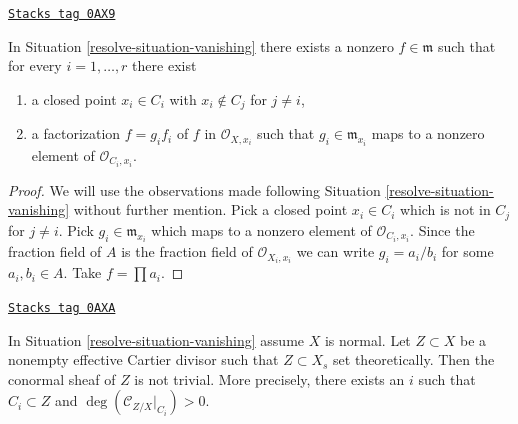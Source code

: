 \begin{lemma}
\label{resolve-lemma-nice-meromorphic-function}
\href{https://stacks.math.columbia.edu/tag/0AX9}{\texttt{Stacks tag 0AX9}}

In Situation \ref{resolve-situation-vanishing} there exists a nonzero
$f \in \mathfrak m$ such that for every $i = 1, \ldots, r$ there exist
\begin{enumerate}
\item a closed point $x_i \in C_i$ with $x_i \not \in C_j$ for $j \not = i$,
\item a factorization $f = g_i f_i$ of $f$ in $\mathcal{O}_{X, x_i}$
such that $g_i \in \mathfrak m_{x_i}$ maps to a nonzero element
of $\mathcal{O}_{C_i, x_i}$.
\end{enumerate}
\end{lemma}

\begin{proof}

We will use the observations made following Situation \ref{resolve-situation-vanishing}
without further mention. Pick a closed point $x_i \in C_i$ which is not in
$C_j$ for $j \not = i$. Pick $g_i \in \mathfrak m_{x_i}$ which maps to a
nonzero element of $\mathcal{O}_{C_i, x_i}$. Since the fraction field of $A$
is the fraction field of $\mathcal{O}_{X_i, x_i}$ we can write
$g_i = a_i/b_i$ for some $a_i, b_i \in A$. Take $f = \prod a_i$.
\end{proof}

\begin{lemma}
\label{resolve-lemma-nontrivial-normal-bundle}
\href{https://stacks.math.columbia.edu/tag/0AXA}{\texttt{Stacks tag 0AXA}}

In Situation \ref{resolve-situation-vanishing} assume $X$ is normal.
Let $Z \subset X$ be a nonempty effective Cartier divisor such that
$Z \subset X_s$ set theoretically.
Then the conormal sheaf of $Z$ is not trivial.
More precisely, there exists an $i$ such that $C_i \subset Z$
and $\deg(\mathcal{C}_{Z/X}|_{C_i}) > 0$.
\end{lemma}

